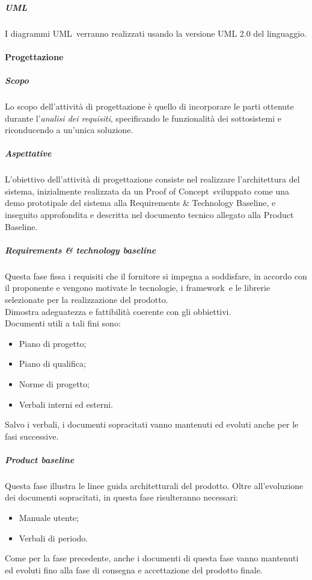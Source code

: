             \subparagraph{UML} \label{subparagraph:UML}
            I diagrammi UML\glo\ verranno realizzati usando la versione UML 2.0 del linguaggio.
          
        \paragraph{Progettazione} \label{paragraph:Progettazione}

            \subparagraph{Scopo} \label{subparagraph:Progettazione_Scopo}
            Lo scopo dell'attività di progettazione è quello di incorporare le parti ottenute durante l'\textit{analisi dei requisiti}, specificando le funzionalità dei sottosistemi
            e riconducendo a un’unica soluzione. 

            \subparagraph{Aspettative} \label{subparagraph:Progettazione_Aspettative}
            L’obiettivo dell’attività di progettazione consiste nel realizzare l’architettura del sistema, inizialmente realizzata da un Proof of Concept\glo\ sviluppato come
            una demo prototipale del sistema alla Requirements \& Technology Baseline, e inseguito approfondita e descritta nel documento tecnico allegato alla Product Baseline.

            \subparagraph{Requirements \& technology baseline} \label{subparagraph:Requirements & technology baseline}
            Questa fase fissa i requisiti che il fornitore si impegna a soddisfare, in accordo con il proponente e vengono motivate le tecnologie,
            i framework\glo\ e le librerie selezionate per la realizzazione del prodotto.\\
            Dimostra adeguatezza e fattibilità coerente con gli obbiettivi.\\
            Documenti utili a tali fini sono:
            \begin{itemize}
                \item Piano di progetto;
                \item Piano di qualifica;
                \item Norme di progetto;
                \item Verbali interni ed esterni.
            \end{itemize}
            Salvo i verbali, i documenti sopracitati vanno mantenuti ed evoluti anche per le fasi successive.\\


            \subparagraph{Product baseline} \label{subparagraph:Product baseline}
            Questa fase illustra le linee guida architetturali del prodotto.
            Oltre all'evoluzione dei documenti sopracitati, in questa fase risulteranno necessari:
            \begin{itemize}
                \item Manuale utente;
                \item Verbali di periodo.
            \end{itemize}
            Come per la fase precedente, anche i documenti di questa fase vanno mantenuti ed evoluti fino alla fase di consegna e accettazione del prodotto finale.


